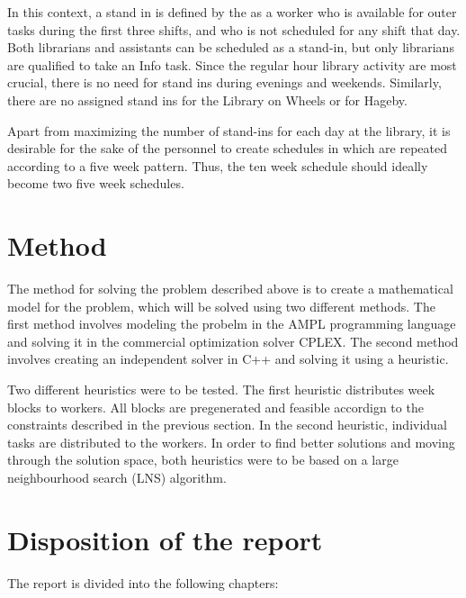 In this context, a stand in is defined by the as a worker who is available for outer tasks during the first three shifts, and who is not scheduled for any shift that day. Both librarians and assistants can be scheduled as a stand-in, but only librarians are qualified to take an Info task. Since the regular hour library activity are most crucial, there is no need for stand ins during evenings and weekends. Similarly, there are no assigned stand ins for the Library on Wheels or for Hageby.

Apart from maximizing the number of stand-ins for each day at the library, it is desirable for the sake of the personnel to create schedules in which are repeated according to a five week pattern. Thus, the ten week schedule should ideally become two five week schedules. 

\section{Method}
The method for solving the problem described above is to create a mathematical model for the problem, which will be solved using two different methods. The first method involves modeling the probelm in the AMPL programming language and solving it in the commercial optimization solver CPLEX. The second method involves creating an independent solver in C++ and solving it using a heuristic. 

Two different heuristics were to be tested. The first heuristic distributes week blocks to workers. All blocks are pregenerated and feasible accordign to the constraints described in the previous section. In the second heuristic, individual tasks are distributed to the workers. In order to find better solutions and moving through the solution space, both heuristics were to be based on a large neighbourhood search (LNS) algorithm.

\section{Disposition of the report}

The report is divided into the following chapters:

